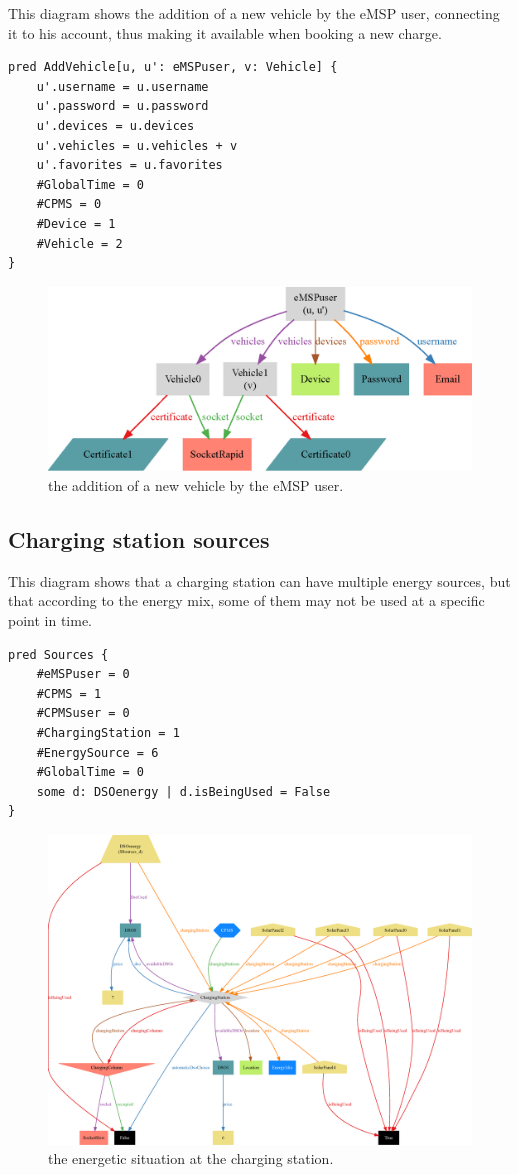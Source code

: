 This diagram shows the addition of a new vehicle by the eMSP user, connecting it to his account, thus making it available when booking a new charge.

\begin{verbatim}
pred AddVehicle[u, u': eMSPuser, v: Vehicle] {
    u'.username = u.username
    u'.password = u.password
    u'.devices = u.devices
    u'.vehicles = u.vehicles + v
    u'.favorites = u.favorites
    #GlobalTime = 0
    #CPMS = 0
    #Device = 1
    #Vehicle = 2
}
\end{verbatim}

\begin{figure}[h!]
    \centering
    \includegraphics[width=0.5\columnwidth]{./images/alloy/vehicle}
    \caption{the addition of a new vehicle by the eMSP user.}
\end{figure}

\pagebreak

\subsection{Charging station sources}

This diagram shows that a charging station can have multiple energy sources, but that according to the energy mix, some of them may not be used at a specific point in time.

\begin{verbatim}
pred Sources {
    #eMSPuser = 0
    #CPMS = 1
    #CPMSuser = 0
    #ChargingStation = 1
    #EnergySource = 6
    #GlobalTime = 0
    some d: DSOenergy | d.isBeingUsed = False
}
\end{verbatim}

\begin{figure}[h!]
    \centering
    \includegraphics[width=\columnwidth]{./images/alloy/sources}
    \caption{the energetic situation at the charging station.}
\end{figure}

